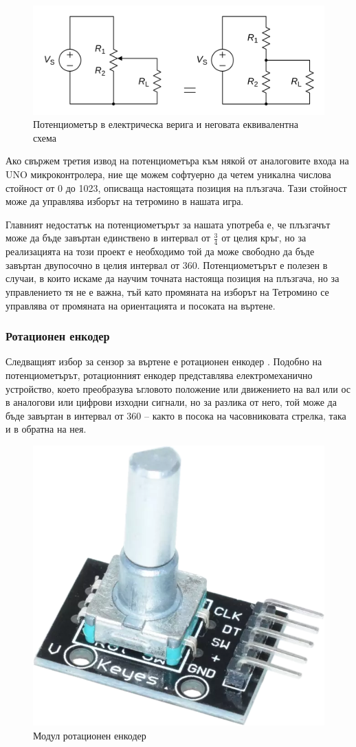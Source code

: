 \documentclass[titlepage, oneside, 12pt]{book}
\begin{document}
\begin{figure}[h!]
    \label{potentiometer_circuit}
    \centering
    \includegraphics[width=0.5\linewidth]{img/potentiometer_circuit.png}
    \caption{Потенциометър в електрическа верига и неговата еквивалентна схема}
\end{figure}


Ако свържем третия извод на потенциометъра към някой от аналоговите входа на UNO микроконтролера,
ние ще можем софтуерно да четем уникална числова стойност от 0 до 1023, описваща настоящата позиция
на плъзгача. Тази стойност може да управлява изборът на тетромино в нашата игра.

Главният недостатък на потенциометърът за нашата употреба е, че плъзгачът може да бъде завъртан
единствено в интервал от $\frac{3}{4}$ от целия кръг, но за реализацията на този проект е необходимо
той да може свободно да бъде завъртан двупосочно в целия интервал от
360\textdegree{}. Потенциометърът е полезен в случаи, в които искаме да научим точната настояща позиция
на плъзгача, но за управлението тя не е важна, тъй като промяната на изборът на Тетромино се управлява
от промяната на ориентацията и посоката на въртене.

\subsubsection{Ротационен енкодер}

Следващият избор за сензор за въртене е ротационен енкодер \cite{encodertut}. Подобно на потенциометърът, ротационният енкодер представлява
електромеханично устройство, което преобразува ъгловото положение или движението на вал или ос
в аналогови или цифрови изходни сигнали, но за разлика от него, той може да
бъде завъртан в интервал от 360\textdegree{} -- както в посока на часовниковата
стрелка, така и в обратна на нея.

\begin{figure}[h!]
    \centering
    \includegraphics[width=0.5\linewidth]{img/encoder.png}
    \caption{Модул ротационен енкодер}
\end{figure}
\end{document}
